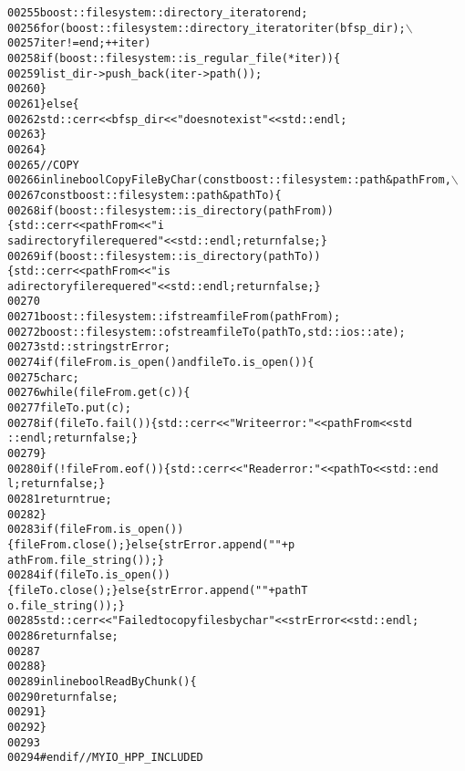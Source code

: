 \begin{footnotesize}
\begin{alltt}
00255             boost::filesystem::directory\_iterator end ;
00256             \textcolor{keywordflow}{for}( boost::filesystem::directory\_iterator iter(bfsp\_dir);\(\backslash\)
00257                     iter != end; ++iter )
00258                 \textcolor{keywordflow}{if}( boost::filesystem::is\_regular\_file( *iter ))\{
00259                     list\_dir->push\_back( iter->path() );
00260                 \}
00261         \}\textcolor{keywordflow}{else}\{
00262             std::cerr<<bfsp\_dir<<\textcolor{stringliteral}{" does not exist"}<<std::endl;
00263         \}
00264     \}
00265     \textcolor{comment}{//COPY}
00266     \textcolor{keyword}{inline} \textcolor{keywordtype}{bool} CopyFileByChar(\textcolor{keyword}{const} boost::filesystem::path &pathFrom,\(\backslash\)
00267                                \textcolor{keyword}{const} boost::filesystem::path &pathTo)\{
00268         \textcolor{keywordflow}{if} ( boost::filesystem::is\_directory(pathFrom) )\{std::cerr<<pathFrom<<\textcolor{stringliteral}{" i
      s a directory file requered"}<<std::endl; \textcolor{keywordflow}{return} \textcolor{keyword}{false}; \}
00269         \textcolor{keywordflow}{if} ( boost::filesystem::is\_directory(pathTo) )\{ std::cerr<<pathFrom<<\textcolor{stringliteral}{" is
       a directory file requered"}<<std::endl; \textcolor{keywordflow}{return} \textcolor{keyword}{false}; \}
00270 
00271         boost::filesystem::ifstream fileFrom (pathFrom);
00272         boost::filesystem::ofstream fileTo (pathTo,std::ios::ate);
00273         std::string strError;
00274         \textcolor{keywordflow}{if} (fileFrom.is\_open() and fileTo.is\_open())\{
00275             \textcolor{keywordtype}{char} c;
00276             \textcolor{keywordflow}{while} (fileFrom.get(c))\{
00277                 fileTo.put(c);
00278                 \textcolor{keywordflow}{if} ( fileTo.fail() ) \{ std::cerr << \textcolor{stringliteral}{"Write error:"}<<pathFrom<<std
      ::endl; \textcolor{keywordflow}{return} \textcolor{keyword}{false}; \}
00279             \}
00280             \textcolor{keywordflow}{if} ( !fileFrom.eof() ) \{ std::cerr << \textcolor{stringliteral}{"Read error:"}<<pathTo<<std::end
      l; \textcolor{keywordflow}{return} \textcolor{keyword}{false}; \}
00281             \textcolor{keywordflow}{return} \textcolor{keyword}{true};
00282         \}
00283         \textcolor{keywordflow}{if} (fileFrom.is\_open())\{ fileFrom.close(); \} \textcolor{keywordflow}{else} \{ strError.append(\textcolor{stringliteral}{" "}+p
      athFrom.file\_string()); \}
00284         \textcolor{keywordflow}{if} (fileTo.is\_open())\{ fileTo.close(); \} \textcolor{keywordflow}{else} \{ strError.append(\textcolor{stringliteral}{" "}+pathT
      o.file\_string()); \}
00285         std::cerr<<\textcolor{stringliteral}{"Failed to copy files by char"}<<strError<<std::endl;
00286         \textcolor{keywordflow}{return} \textcolor{keyword}{false};
00287 
00288     \}
00289     \textcolor{keyword}{inline} \textcolor{keywordtype}{bool} ReadByChunk()\{
00290         \textcolor{keywordflow}{return} \textcolor{keyword}{false};
00291     \}
00292 \}
00293 
00294 \textcolor{preprocessor}{#endif // MYIO\_HPP\_INCLUDED}
\end{alltt}\end{footnotesize}

